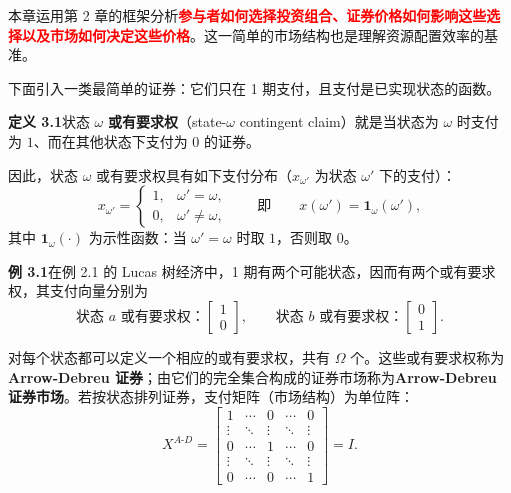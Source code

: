 

\ifdefined\WJHandoutKnowledge


本章运用第 2 章的框架分析\textcolor{red}{\textbf{参与者如何选择投资组合、证券价格如何影响这些选择以及市场如何决定这些价格}}。这一简单的市场结构也是理解资源配置效率的基准。

\begin{tcolorbox}[knowledge,title=3.1 Arrow-Debreu 证券市场]
下面引入一类最简单的证券：它们只在 1 期支付，且支付是已实现状态的函数。

\begin{tcolorbox}[knowledge]
\textbf{定义 3.1}\quad 状态 $\omega$ \textbf{或有要求权}（state-$\omega$ contingent claim）就是当状态为 $\omega$ 时支付为 $1$、而在其他状态下支付为 $0$ 的证券。
\end{tcolorbox}

因此，状态 $\omega$ 或有要求权具有如下支付分布（$x_{\omega'}$ 为状态 $\omega'$ 下的支付）：
\[
    x_{\omega'}=
    \begin{cases}
        1, & \omega'=\omega,\\
        0, & \omega'\neq\omega,
    \end{cases}
    \qquad\text{即}\qquad
    x(\omega')=\mathbf{1}_{\omega}(\omega'),
\]
其中 $\mathbf{1}_{\omega}(\cdot)$ 为示性函数：当 $\omega'=\omega$ 时取 $1$，否则取 $0$。

\begin{tcolorbox}[example]
\textbf{例 3.1}\quad 在例 2.1 的 Lucas 树经济中，1 期有两个可能状态，因而有两个或有要求权，其支付向量分别为
\[
    \text{状态 $a$ 或有要求权：}\begin{bmatrix}1 \\ 0\end{bmatrix},\qquad
    \text{状态 $b$ 或有要求权：}\begin{bmatrix}0 \\ 1\end{bmatrix}.
\]
\end{tcolorbox}

对每个状态都可以定义一个相应的或有要求权，共有 $\Omega$ 个。这些或有要求权称为\textbf{Arrow-Debreu 证券}；由它们的完全集合构成的证券市场称为\textbf{Arrow-Debreu 证券市场}。若按状态排列证券，支付矩阵（市场结构）为单位阵：
\[
    X^{A\text{-}D}=
    \begin{bmatrix}
        1 & \cdots & 0 & \cdots & 0 \\
        \vdots & \ddots & \vdots & \ddots & \vdots \\
        0 & \cdots & 1 & \cdots & 0 \\
        \vdots & \ddots & \vdots & \ddots & \vdots \\
        0 & \cdots & 0 & \cdots & 1
    \end{bmatrix}
    =I.
\]
\end{tcolorbox}

